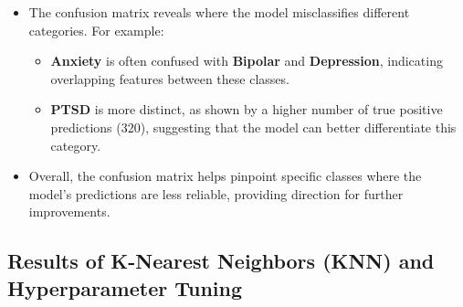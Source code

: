 \begin{itemize}
    \item The confusion matrix reveals where the model misclassifies different categories. For example:
    \begin{itemize}
        \item \textbf{Anxiety} is often confused with \textbf{Bipolar} and \textbf{Depression}, indicating overlapping features between these classes.
        \item \textbf{PTSD} is more distinct, as shown by a higher number of true positive predictions (320), suggesting that the model can better differentiate this category.
    \end{itemize}
    \item Overall, the confusion matrix helps pinpoint specific classes where the model's predictions are less reliable, providing direction for further improvements.
\end{itemize}




\subsection{Results of K-Nearest Neighbors (KNN) and Hyperparameter Tuning}

